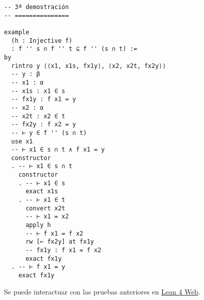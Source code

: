 \begin{verbatim}
-- 3ª demostración
-- ===============

example
  (h : Injective f)
  : f '' s ∩ f '' t ⊆ f '' (s ∩ t) :=
by
  rintro y ⟨⟨x1, x1s, fx1y⟩, ⟨x2, x2t, fx2y⟩⟩
  -- y : β
  -- x1 : α
  -- x1s : x1 ∈ s
  -- fx1y : f x1 = y
  -- x2 : α
  -- x2t : x2 ∈ t
  -- fx2y : f x2 = y
  -- ⊢ y ∈ f '' (s ∩ t)
  use x1
  -- ⊢ x1 ∈ s ∩ t ∧ f x1 = y
  constructor
  . -- ⊢ x1 ∈ s ∩ t
    constructor
    . -- ⊢ x1 ∈ s
      exact x1s
    . -- ⊢ x1 ∈ t
      convert x2t
      -- ⊢ x1 = x2
      apply h
      -- ⊢ f x1 = f x2
      rw [← fx2y] at fx1y
      -- fx1y : f x1 = f x2
      exact fx1y
  . -- ⊢ f x1 = y
    exact fx1y
\end{verbatim}
Se puede interactuar con las pruebas anteriores en \href{https://lean.math.hhu.de/\#url=https://raw.githubusercontent.com/jaalonso/Calculemus2/main/src/Imagen\_de\_la\_interseccion\_de\_aplicaciones\_inyectivas.lean}{Lean 4 Web}.


